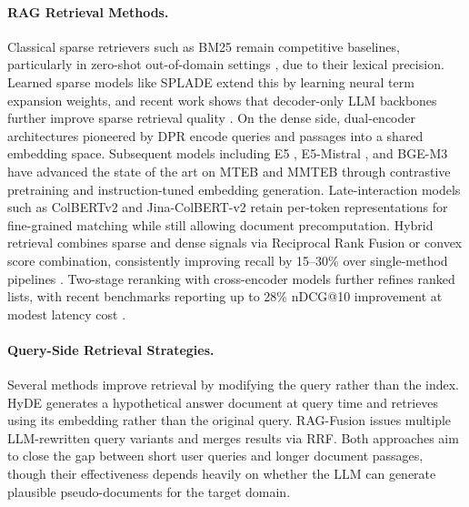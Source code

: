 \documentclass[11pt]{article}
\begin{document}
\paragraph{RAG Retrieval Methods.}
Classical sparse retrievers such as BM25 remain competitive baselines, particularly in zero-shot out-of-domain settings \citep{thakur2021beir}, due to their lexical precision. Learned sparse models like SPLADE \citep{formal2021splade} extend this by learning neural term expansion weights, and recent work shows that decoder-only LLM backbones further improve sparse retrieval quality \citep{doshi2024mistralsplade}. On the dense side, dual-encoder architectures pioneered by DPR \citep{karpukhin2020dpr} encode queries and passages into a shared embedding space. Subsequent models including E5 \citep{wang2022e5}, E5-Mistral \citep{wang2024e5mistral}, and BGE-M3 \citep{chen2024bgem3} have advanced the state of the art on MTEB \citep{muennighoff2023mteb} and MMTEB \citep{enevoldsen2025mmteb} through contrastive pretraining and instruction-tuned embedding generation. Late-interaction models such as ColBERTv2 \citep{santhanam2022colbertv2} and Jina-ColBERT-v2 \citep{sturua2024jinacolbert} retain per-token representations for fine-grained matching while still allowing document precomputation. Hybrid retrieval combines sparse and dense signals via Reciprocal Rank Fusion \citep{cormack2009rrf} or convex score combination, consistently improving recall by 15--30\% over single-method pipelines \citep{li2025ragbestpractices}. Two-stage reranking with cross-encoder models further refines ranked lists, with recent benchmarks reporting up to 28\% nDCG@10 improvement at modest latency cost \citep{gao2024ragsurvey}.

\paragraph{Query-Side Retrieval Strategies.}
Several methods improve retrieval by modifying the query rather than the index. HyDE \citep{gao2023hyde} generates a hypothetical answer document at query time and retrieves using its embedding rather than the original query. RAG-Fusion \citep{raudaschl2023ragfusion} issues multiple LLM-rewritten query variants and merges results via RRF. Both approaches aim to close the gap between short user queries and longer document passages, though their effectiveness depends heavily on whether the LLM can generate plausible pseudo-documents for the target domain.
\end{document}
